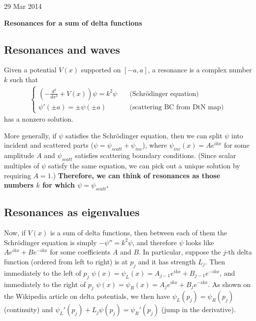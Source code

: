 \documentclass[letterpaper,12pt]{article}
\begin{document}
\begin{flushright}29 Mar 2014\end{flushright}

\begin{center}{\bf Resonances for a sum of delta functions}\end{center}

\subsection*{Resonances and waves}

Given a potential $V(x)$ supported on $[-a,a]$, a resonance is a 
complex number $k$ such that
\begin{align}\label{SE+DtN}
 \begin{cases}
  \left(-\frac{d^2}{dx^2} + V(x)\right)\psi = k^2 \psi
       &\quad\text{(Schr\"odinger equation)}\\ 
  \psi'(\pm a) = \pm \psi(\pm a)
       &\quad\text{(scattering BC from DtN map)}
 \end{cases}
\end{align}
has a nonzero solution.

More generally, if $\psi$ satisfies the Schr\"odinger equation, then
we can split $\psi$ into incident and scattered parts ($\psi = 
\psi_{scatt} + \psi_{inc}$), where
$\psi_{inc}(x) = Ae^{ikx}$ for some amplitude $A$ and $\psi_{scatt}$
satisfies scattering boundary conditions. (Since scalar multiples
of $\psi$ satisfy the same equation, we can pick out a unique solution
by requiring $A = 1$.) {\bf Therefore, we can think of resonances as those
numbers $k$ for which $\psi = \psi_{scatt}$.}

\subsection*{Resonances as eigenvalues}

Now, if $V(x)$ is a sum of delta functions, then between each of them the
Schr\"odinger equation is simply $-\psi'' = k^2 \psi$, and therefore
$\psi$ looks like $Ae^{ikx} + Be^{-ikx}$ for some coefficients $A$ and $B$.
In particular, suppose the $j$-th delta function (ordered from left to right)
is at $p_j$ and it has strength $L_j$. Then immediately to the left of $p_j$
$\psi(x) = \psi_L(x) = A_{j-1}e^{ikx} + B_{j-1}e^{-ikx}$, and immediately to
the right of $p_j$ $\psi(x) = \psi_R(x) = A_j e^{ikx} + B_j e^{-ikx}$. As
shown on the Wikipedia article on delta potentials, we then have
$\psi_L(p_j) = \psi_R(p_j)$ (continuity) and $\psi_L'(p_j) + L_j\psi(p_j) = \psi_R'(p_j)$ (jump in the derivative).
\end{document}
